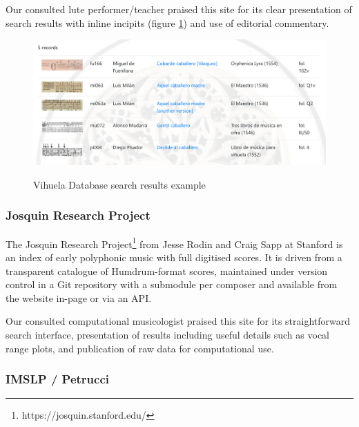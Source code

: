 \documentclass[9pt,twocolumn]{extarticle}
\begin{document}
\begin{sloppypar}
  Our consulted lute performer/teacher praised this site for its clear
  presentation of search results with inline incipits (figure
  \ref{fig:vihuela}) and use of editorial commentary.
  
  \begin{figure}[h]
  \centering
  \caption{Vihuela Database search results example}
  \includegraphics[width=\columnwidth]{images/vihuela-search-results}
  \label{fig:vihuela}
  \end{figure}
  
  \subsubsection{Josquin Research Project}

  The Josquin Research Project\footnote{https://josquin.stanford.edu/}
  from Jesse Rodin and Craig Sapp at Stanford is an index of early
  polyphonic music with full digitised scores. It is driven from a
  transparent catalogue of Humdrum-format scores, maintained under
  version control in a Git repository with a submodule per composer
  and available from the website in-page or via an API.

  Our consulted computational musicologist praised this site for its
  straightforward search interface, presentation of results including
  useful details such as vocal range plots, and publication of raw
  data for computational use.
  
  \subsubsection{IMSLP / Petrucci}


\end{sloppypar}
\end{document}
